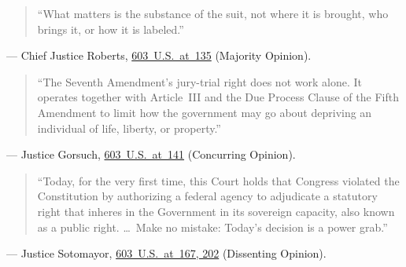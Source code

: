 \documentclass[12pt]{article}
\begin{document}
\begin{quote}
``What matters is the substance of the suit, not where it is brought, who brings it, or how it is labeled.''
\end{quote}
\noindent --- Chief Justice Roberts, \href{https://supreme.justia.com/cases/federal/us/603/22-859/}{603~U.S.~at~135} (Majority Opinion).

\begin{quote}
``The Seventh Amendment's jury-trial right does not work alone. It operates together with Article~III and the Due Process Clause of the Fifth Amendment to limit how the government may go about depriving an individual of life, liberty, or property.''
\end{quote}
\noindent --- Justice Gorsuch, \href{https://supreme.justia.com/cases/federal/us/603/22-859/}{603~U.S.~at~141} (Concurring Opinion).

\begin{quote}
``Today, for the very first time, this Court holds that Congress violated the Constitution by authorizing a federal agency to adjudicate a statutory right that inheres in the Government in its sovereign capacity, also known as a public right. \ldots\ Make no mistake: Today's decision is a power grab.''
\end{quote}
\noindent --- Justice Sotomayor, \href{https://supreme.justia.com/cases/federal/us/603/22-859/}{603~U.S.~at~167, 202} (Dissenting Opinion).
\end{document}

